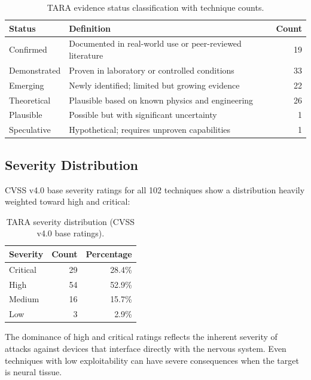 \begin{table}[H]
\centering
\caption{TARA evidence status classification with technique counts.}
\label{tab:status}
\small
\begin{tabular}{@{}l l r@{}}
\toprule
\textbf{Status} & \textbf{Definition} & \textbf{Count} \\
\midrule
Confirmed    & Documented in real-world use or peer-reviewed literature & 19 \\
Demonstrated & Proven in laboratory or controlled conditions            & 33 \\
Emerging     & Newly identified; limited but growing evidence           & 22 \\
Theoretical  & Plausible based on known physics and engineering          & 26 \\
Plausible    & Possible but with significant uncertainty                & 1 \\
Speculative  & Hypothetical; requires unproven capabilities             & 1 \\
\bottomrule
\end{tabular}
\end{table}

\subsection{Severity Distribution}

CVSS v4.0 base severity ratings for all 102 techniques show a distribution
heavily weighted toward high and critical:

\begin{table}[H]
\centering
\caption{TARA severity distribution (CVSS v4.0 base ratings).}
\label{tab:severity}
\small
\begin{tabular}{@{}l r r@{}}
\toprule
\textbf{Severity} & \textbf{Count} & \textbf{Percentage} \\
\midrule
Critical & 29 & 28.4\% \\
High     & 54 & 52.9\% \\
Medium   & 16 & 15.7\% \\
Low      &  3 &  2.9\% \\
\bottomrule
\end{tabular}
\end{table}

The dominance of high and critical ratings reflects the inherent severity of
attacks against devices that interface directly with the nervous system. Even
techniques with low exploitability can have severe consequences when the target
is neural tissue.


